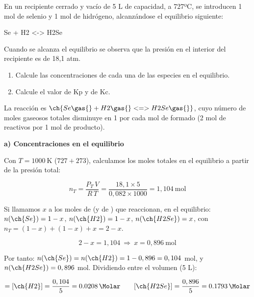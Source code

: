 \begin{exerciseEVAU}
    En un recipiente cerrado y vacío de 5 L de capacidad, a 727ºC, se introducen 1 mol de selenio y 1 mol de
hidrógeno, alcanzándose el equilibrio siguiente:
    \begin{centeredequation}
        Se \gas{} + H2 \gas{} <-> H2Se \gas{}
    \end{centeredequation}
    Cuando se alcanza el equilibrio se observa que la presión en el interior del recipiente es de 18,1 atm.
    \begin{enumerate}[label=\letraminuscula]
        \item Calcule las concentraciones de cada una de las especies en el equilibrio.
        \item Calcule el valor de Kp y de Kc.
    \end{enumerate}
\begin{solu}

    La reacción es \(\ch{Se \gas{} + H2 \gas{} <=> H2Se \gas{}}\), cuyo número de moles gaseosos totales disminuye en 1 por cada mol de  formado (2 mol de reactivos por 1 mol de producto).

    \textbf{a) Concentraciones en el equilibrio}

    Con \(T = \SI{1000}{\kelvin}\) (\(727+273\)), calculamos los moles totales en el equilibrio a partir de la presión total:

    \begin{equation*}
        n_T = \dfrac{P_T\, V}{R\, T} = \dfrac{18,1 \times 5}{0,082 \times 1000} = 1,104 \ \text{mol}
    \end{equation*}

    Si llamamos \(x\) a los moles de  (y de ) que reaccionan, en el equilibrio: \(n(\ch{Se}) = 1-x\), \(n(\ch{H2}) = 1-x\), \(n(\ch{H2Se}) = x\), con \(n_T = (1-x)+(1-x)+x = 2-x\).

    \begin{equation*}
        2 - x = 1,104 \ \Rightarrow \ x = 0,896 \ \text{mol}
    \end{equation*}

    Por tanto: \(n(\ch{Se}) = n(\ch{H2}) = 1 - 0,896 = 0,104\) mol, y \(n(\ch{H2Se}) = 0,896\) mol. Dividiendo entre el volumen (5 L):

    \begin{equation*}
        [\ch{Se}] = [\ch{H2}] = \dfrac{0,104}{5} = \SI{0.0208}{\Molar} \qquad [\ch{H2Se}] = \dfrac{0,896}{5} = \SI{0.1793}{\Molar}
    \end{equation*}


\end{solu}
\end{exerciseEVAU}
